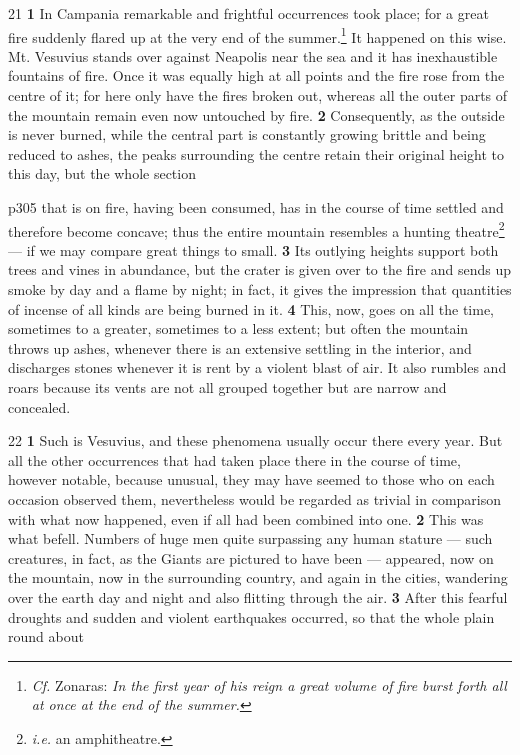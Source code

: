 21
\textbf{1} In Campania remarkable and frightful occurrences took place; for a great fire suddenly flared up at the very end of the summer.\texthebrew{⁠}\footnote{\emph{Cf.} Zonaras: \emph{In the first year of his reign a great volume of fire burst forth all at once at the end of the summer.}

} It happened on this wise. Mt. Vesuvius stands over against Neapolis near the sea and it has inexhaustible fountains of fire. Once it was equally high at all points and the fire rose from the centre of it; for here only have the fires broken out, whereas all the outer parts of the mountain remain even now untouched by fire. \textbf{2} Consequently, as the outside is never burned, while the central part is constantly growing brittle and being reduced to ashes, the peaks surrounding the centre retain their original height to this day, but the whole section

p305 that is on fire, having been consumed, has in the course of time settled and therefore become concave; thus the entire mountain resembles a hunting theatre\texthebrew{⁠}\footnote{\emph{i.e.} an amphitheatre.

} \texthebrew{—} if we may compare great things to small. \textbf{3} Its outlying heights support both trees and vines in abundance, but the crater is given over to the fire and sends up smoke by day and a flame by night; in fact, it gives the impression that quantities of incense of all kinds are being burned in it. \textbf{4} This, now, goes on all the time, sometimes to a greater, sometimes to a less extent; but often the mountain throws up ashes, whenever there is an extensive settling in the interior, and discharges stones whenever it is rent by a violent blast of air. It also rumbles and roars because its vents are not all grouped together but are narrow and concealed.

22
\textbf{1} Such is Vesuvius, and these phenomena usually occur there every year. But all the other occurrences that had taken place there in the course of time, however notable, because unusual, they may have seemed to those who on each occasion observed them, nevertheless would be regarded as trivial in comparison with what now happened, even if all had been combined into one. \textbf{2} This was what befell. Numbers of huge men quite surpassing any human stature \texthebrew{—} such creatures, in fact, as the Giants are pictured to have been \texthebrew{—} appeared, now on the mountain, now in the surrounding country, and again in the cities, wandering over the earth day and night and also flitting through the air. \textbf{3} After this fearful droughts and sudden and violent earthquakes occurred, so that the whole plain round about

